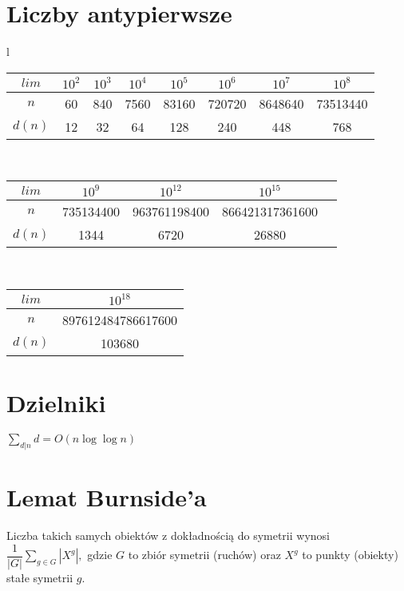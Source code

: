 \section{Liczby antypierwsze}
		\begin{center}
			\begin{tabular}{l}
				\begin{tabular}{c|c@{\ }c@{\ }c@{\ }c@{\ }c@{\ }c@{\ }c@{\ }}
					$lim$  & $10^2$ & $10^3$ & $10^4$ & $10^5$ & $10^6$ & $10^7$ & $10^8$ \\
					\hline
					$n$ & 60 & 840 & 7560 & 83160 & 720720 & 8648640 & 73513440 \\
					\hline
					$d(n)$ & 12 & 32 & 64 & 128 & 240 & 448 & 768 \\
				\end{tabular}\\
				\begin{tabular}{c|c@{\ }c@{\ }c@{\ }c}
					$lim$  & $10^9$ & $10^{12}$  & $10^{15}$ \\
					\hline
					$n$ & 735134400 & 963761198400 & 866421317361600 \\
					\hline
					$d(n)$ & 1344 & 6720 & 26880 \\
				\end{tabular}\\
				\begin{tabular}{c|c@{\ }}
					$lim$  & $10^{18}$\\
					\hline
					$n$ & 897612484786617600\\
					\hline
					$d(n)$ & 103680\\
				\end{tabular}
			\end{tabular}
		\end{center}

\section{Dzielniki}
	$\sum_{d|n} d = O(n \log \log n)$


\section{Lemat Burnside'a}
	Liczba takich samych obiektów z dokładnością do symetrii wynosi
	$ {\dfrac {1}{|G|}}\sum _{{g\in G}}|X^{g}|, $
	gdzie $G$ to zbiór symetrii (ruchów) oraz $X^g$ to punkty (obiekty) stałe symetrii $g$.

